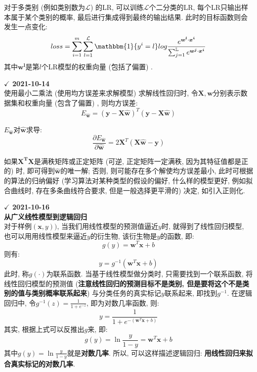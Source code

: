 对于多类别 (例如类别数为$\mathcal{L}$) 的LR, 可以训练$\mathcal{L}$个二分类的LR, 每个LR只输出样本属于某个类别的概率, 最后进行集成得到最终的输出结果. 此时的目标函数则会发生一点变化: 
$$
loss = \sum_{i=1}^{m} \sum_{l=1}^{\mathcal{L}} \mathbbm{1}\{y^i = l\} log \frac{e^{ \boldsymbol{w^l} \cdot \boldsymbol{x^i} } }{ \sum_{j=1}^{\mathbb{L}} e^{ \boldsymbol{w^j} \cdot \boldsymbol{x^i}} }
$$
其中$\boldsymbol{w^l}$是第$l$个LR模型的权重向量 (包括了偏置) . 

\textbf{$\checkmark$ 2021-10-14}\\
使用最小二乘法 (使用均方误差来求解模型) 求解线性回归时, 令$\boldsymbol{X}, \boldsymbol{w}$分别表示数据集和权重向量 (包含了偏置) , 则均方误差: 
$$
E_{\boldsymbol{\hat w}} = (\boldsymbol{y} - \boldsymbol{X} \boldsymbol{\hat w})^T (\boldsymbol{y} - \boldsymbol{X} \boldsymbol{\hat w})
$$

$E_{\boldsymbol{\hat w}}$对$\boldsymbol{\hat w}$求导: 
$$
\frac{\partial E_{\boldsymbol{\hat w}}}{\partial \boldsymbol{\hat w}} = 2 \boldsymbol{X}^T(\boldsymbol{X}\boldsymbol{\hat w} - \boldsymbol{y})
$$

如果$\boldsymbol{X^T X}$是满秩矩阵或正定矩阵 (可逆, 正定矩阵一定满秩, 因为其特征值都是正的) 时, 即可得到$\boldsymbol{\hat w}$的唯一解; 否则, 则可能存在多个解使均方误差最小, 此时可根据的算法的归纳偏好 (学习算法对某种类型的假设的偏好, 什么样的模型更好, 例如拟合曲线时, 存在多条曲线符合要求, 但是一般选择更平滑的) 决定, 如引入正则化. 

\textbf{$\checkmark$ 2021-10-16}\\
\textbf{从广义线性模型到逻辑回归} \\
对于样例$(\boldsymbol{x}, y))$, 当我们用线性模型的预测值逼近$y$时, 就得到了线性回归模型, 也可以用用线性模型来逼近$y$的衍生物, 该衍生物是$y$的函数, 即: 
$$
g(y) = \boldsymbol{w}^T \boldsymbol{x} + b
$$
则有: 
$$
y = g^{-1}(\boldsymbol{w}^T \boldsymbol{x} + b)
$$
此时, 称$g(\cdot)$为联系函数. 当基于线性模型做分类时, 只需要找到一个联系函数, 将线性回归模型的预测值 (\textbf{注意线性回归的预测目标不是类别, 但是要将这个不是类别的值与类别概率联系起来}) 与分类任务的真实标记$y$联系起来, 即找到$g^{-1}$. 在逻辑回归中, 令$g^{-1}(z) = \frac{1}{1 + e ^{-z}}$, 即为对数几率函数, 则: 
$$
y = \frac{1}{1 + e^{-(\boldsymbol{w}^T \boldsymbol{x} + b)}}
$$
其实, 根据上式可以反推出$g$来, 即: 
$$
g(y) = \ln \frac{y}{1 - y} = \boldsymbol{w}^T \boldsymbol{x} + b
$$
其中$g(y) = \ln \frac{y}{1 - y}$就是\textbf{对数几率}. 所以, 可以这样描述逻辑回归: \textbf{用线性回归来拟合真实标记的对数几率}. 

